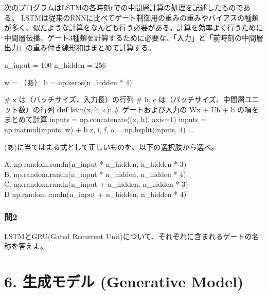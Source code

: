 \documentclass[
  letterpaper,
  DIV=11,
  numbers=noendperiod]{scrreprt}
\newenvironment{Shaded}{\begin{snugshade}}{\end{snugshade}}
\newcommand{\CommentTok}[1]{\textcolor[rgb]{0.37,0.37,0.37}{#1}}
\newcommand{\DecValTok}[1]{\textcolor[rgb]{0.68,0.00,0.00}{#1}}
\newcommand{\KeywordTok}[1]{\textcolor[rgb]{0.00,0.23,0.31}{\textbf{#1}}}
\newcommand{\NormalTok}[1]{\textcolor[rgb]{0.00,0.23,0.31}{#1}}
\newcommand{\OperatorTok}[1]{\textcolor[rgb]{0.37,0.37,0.37}{#1}}
\begin{document}
次のプログラムはLSTMの各時刻tでの中間層計算の処理を記述したものである。
LSTMは従来のRNNに比べてゲート制御用の重みの重みやバイアスの種類が多く、似たような計算をなんども行う必要がある。計算を効率よく行うために中間層伝播、ゲート3種類を計算するために必要な、「入力」と「前時刻の中間層出力」の重み付き線形和はまとめて計算する。

\begin{Shaded}
\begin{Highlighting}[]
\NormalTok{n\_input }\OperatorTok{=} \DecValTok{100}  
\NormalTok{n\_hidden }\OperatorTok{=} \DecValTok{256}

\NormalTok{w }\OperatorTok{=}\NormalTok{ （あ）  }
\NormalTok{b }\OperatorTok{=}\NormalTok{ np.zeros(n\_hidden }\OperatorTok{*} \DecValTok{4}\NormalTok{)}

\CommentTok{\# x は（バッチサイズ、入力長）の行列  }
\CommentTok{\# h, c は（バッチサイズ、中間層ユニット数）の行列  }
\KeywordTok{def}\NormalTok{ lstm(x, h, c):  }
    \CommentTok{\# ゲートおよび入力の Wx + Uh + b の項をまとめて計算  }
\NormalTok{    inputs }\OperatorTok{=}\NormalTok{ np.concatenate((x, h), axis}\OperatorTok{=}\DecValTok{1}\NormalTok{)  }
\NormalTok{    inputs }\OperatorTok{=}\NormalTok{ np.matmul(inputs, w) }\OperatorTok{+}\NormalTok{ b  }
\NormalTok{    z, i, f, o }\OperatorTok{=}\NormalTok{ np.hsplit(inputs, }\DecValTok{4}\NormalTok{)  }
\NormalTok{    ...}
\end{Highlighting}
\end{Shaded}

(あ)に当てはまる式として正しいものを、以下の選択肢から選べ。

A. np.random.randn(n\_input * n\_hidden, n\_hidden * 3)\\
B. np.random.randn(n\_input * n\_hidden, n\_hidden * 4)\\
C. np.random.randn(n\_input + n\_hidden, n\_hidden * 3)\\
D np.random.randn(n\_input + n\_hidden, n\_hidden * 4)

\subsection{問2}\label{ux554f2-2}

LSTMとGRU(Gated Recurrent
Unit)について、それぞれに含まれるゲートの名称を答えよ。

\chapter{6. 生成モデル (Generative
Model)}\label{ux751fux6210ux30e2ux30c7ux30eb-generative-model}
\end{document}
